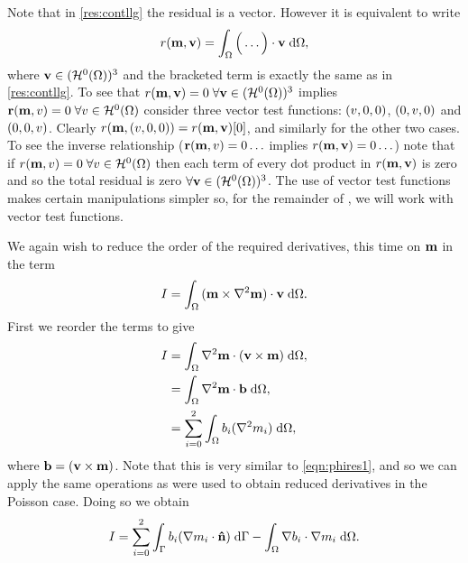 Note that in \cref{res:contllg} the residual is a vector.
However it is equivalent to write
\begin{equation}
  r(\mathbf{m}, \mathbf{v}) = \int_\Omega \Big( \ldots  \Big) \cdot \mathbf{v} {\; \mathrm{{d}}}\Omega,
\end{equation}
where $\mathbf{v} \in (\mathcal{H}^0(\Omega))^3$ and the bracketed term is exactly the same as in \cref{res:contllg}.
To see that $r(\mathbf{m}, \mathbf{v}) = 0\; \forall \mathbf{v} \in (\mathcal{H}^0(\Omega))^3$ implies $\mathbf{r}(\mathbf{m}, v) = 0 \; \forall v \in \mathcal{H}^0(\Omega)$ consider three vector test functions: $(v, 0, 0)$, $(0, v, 0)$ and $(0, 0, v)$.
Clearly $r(\mathbf{m}, (v, 0, 0)) = r(\mathbf{m}, \mathbf{v})[0]$, and similarly for the other two cases.
To see the inverse relationship (\ie $\mathbf{r}(\mathbf{m}, v) = 0 \ldots$ implies $r(\mathbf{m}, \mathbf{v}) = 0 \ldots$) note that if $r(\mathbf{m}, v) = 0\; \forall v \in \mathcal{H}^0(\Omega)$ then each term of every dot product in $r(\mathbf{m}, \mathbf{v})$ is zero and so the total residual is zero $\forall \mathbf{v} \in (\mathcal{H}^0(\Omega))^3$.
The use of vector test functions makes certain manipulations simpler so, for the remainder of , we will work with vector test functions.

We again wish to reduce the order of the required derivatives, this time on $\mathbf{m}$ in the term
\begin{equation}
  I = {\int_{\Omega} { (\mathbf{m} \times \nabla^2 \mathbf{m}) \cdot \mathbf{v} } {\; \mathrm{{d}}} {\Omega}}.
  \label{eq:46}
\end{equation}
First we reorder the terms to give
\begin{equation}
  \begin{aligned}
    I &= {\int_{\Omega} {\nabla^2 \mathbf{m} \cdot (\mathbf{v} \times \mathbf{m})} {\; \mathrm{{d}}} {\Omega}}, \\
      &= {\int_{\Omega} {\nabla^2 \mathbf{m} \cdot {\mathbf{b}}} {\; \mathrm{{d}}} {\Omega}}, \\
      &= \sum_{i=0}^2 {\int_{\Omega} { b_i (\nabla^2 m_i)} {\; \mathrm{{d}}} {\Omega}},
  \end{aligned}
\end{equation}
where ${\mathbf{b}} = (\mathbf{v} \times \mathbf{m})$.
Note that this is very similar to \cref{eqn:phires1}, and so we can apply the same operations as were used to obtain reduced derivatives in the Poisson case. 
Doing so we obtain
\begin{equation}
  I = \sum_{i=0}^2 {\int_{{\Gamma}} {b_i (\nabla m_i \cdot \mathbf{\hat{n}})} {\; \mathrm{{d}}} {{\Gamma}}} - {\int_{\Omega} {\nabla b_i \cdot \nabla m_i} {\; \mathrm{{d}}} {\Omega}}.
\end{equation}

